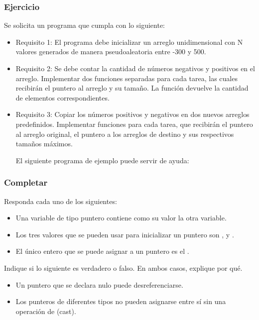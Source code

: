 \subsubsection{Ejercicio}
Se solicita un programa que cumpla con lo siguiente:
\begin{itemize}[a)]
  \item Requisito 1:
    El programa debe inicializar un arreglo unidimensional con N valores generados de manera pseudoaleatoria entre -300 y 500.

  \item Requisito 2:
    Se debe contar la cantidad de números negativos y positivos en el arreglo. Implementar dos funciones separadas para cada tarea, las cuales recibirán el puntero al arreglo y su tamaño. La función devuelve la cantidad de elementos correspondientes.

  \item Requisito 3:
    Copiar los números positivos y negativos en dos nuevos arreglos predefinidos. Implementar funciones para cada tarea, que recibirán el puntero al arreglo original, el puntero a los arreglos de destino y sus respectivos tamaños máximos.

    El siguiente programa de ejemplo puede servir de ayuda:

    \lstset{inputencoding=utf8/latin1}
    
\end{itemize}


\subsubsection{Completar}
Responda cada uno de los siguientes:
\begin{itemize}[a)]
\item Una variable de tipo puntero contiene como su valor la \underspace otra variable.
\item Los tres valores que se pueden usar para inicializar un puntero son \underspace, \underspace y \underspace.
\item El único entero que se puede asignar a un puntero es el \underspace.
\end{itemize}

Indique si lo siguiente es verdadero o falso. En ambos casos, explique por qué.
\begin{itemize}[a)]
\item Un puntero que se declara nulo puede desreferenciarse.
\item Los punteros de diferentes tipos no pueden asignarse entre sí sin una operación de (cast).
\end{itemize}


